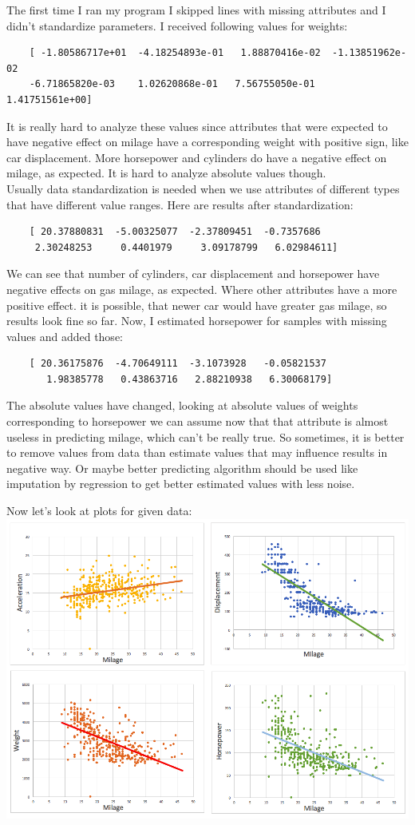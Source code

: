 \documentclass[12pt, letterpaper]{article}
\begin{document}
\begin{enumerate}[label=\Roman*.]
	The first time I ran my program I skipped lines with missing attributes and I didn't standardize parameters. I received following values for weights:
	\begin{verbatim}
	[ -1.80586717e+01  -4.18254893e-01   1.88870416e-02  -1.13851962e-02
  	-6.71865820e-03    1.02620868e-01   7.56755050e-01   1.41751561e+00]
	\end{verbatim}
	It is really hard to analyze these values since attributes that were expected to have negative effect on milage have a corresponding weight with positive sign, like car displacement. More horsepower and cylinders do have a negative effect on milage, as expected. It is hard to analyze absolute values though. \\
	Usually data standardization is needed when we use attributes of different types that have different value ranges. Here are results after standardization:
	\begin{verbatim}
	[ 20.37880831  -5.00325077  -2.37809451  -0.7357686    
	 2.30248253     0.4401979     3.09178799   6.02984611]
	\end{verbatim}
	We can see that number of cylinders, car displacement and horsepower have negative effects on gas milage, as expected. Where other attributes have a more positive effect. it is possible, that newer car would have greater gas milage, so results look fine so far.
	Now, I estimated horsepower for samples with missing values and added those:
	\begin{verbatim}
	[ 20.36175876  -4.70649111  -3.1073928   -0.05821537
	   1.98385778   0.43863716   2.88210938   6.30068179]
	\end{verbatim}
	The absolute values have changed, looking at absolute values of weights corresponding to horsepower we can assume now that that attribute is almost useless in predicting milage, which can't be really true. So sometimes, it is better to remove values from data than estimate values that may influence results in negative way. Or maybe better predicting algorithm should be used like imputation by regression to get better estimated values with less noise.
	
	Now let's look at plots for given data: \\
	\includegraphics[scale=0.45]{pics/contplots.png} \\
	
\end{enumerate}
	
\end{document}
